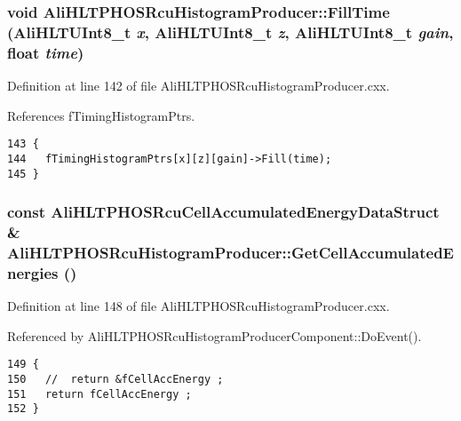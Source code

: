 \subsubsection{\setlength{\rightskip}{0pt plus 5cm}void Ali\-HLTPHOSRcu\-Histogram\-Producer::Fill\-Time ({\bf Ali\-HLTUInt8\_\-t} {\em x}, {\bf Ali\-HLTUInt8\_\-t} {\em z}, {\bf Ali\-HLTUInt8\_\-t} {\em gain}, float {\em time})}\label{classAliHLTPHOSRcuHistogramProducer_a12}




Definition at line 142 of file Ali\-HLTPHOSRcu\-Histogram\-Producer.cxx.

References f\-Timing\-Histogram\-Ptrs.

\footnotesize\begin{verbatim}143 {
144   fTimingHistogramPtrs[x][z][gain]->Fill(time);
145 }
\end{verbatim}\normalsize 


\subsubsection{\setlength{\rightskip}{0pt plus 5cm}const {\bf Ali\-HLTPHOSRcu\-Cell\-Accumulated\-Energy\-Data\-Struct} \& Ali\-HLTPHOSRcu\-Histogram\-Producer::Get\-Cell\-Accumulated\-Energies ()}\label{classAliHLTPHOSRcuHistogramProducer_a4}




Definition at line 148 of file Ali\-HLTPHOSRcu\-Histogram\-Producer.cxx.

Referenced by Ali\-HLTPHOSRcu\-Histogram\-Producer\-Component::Do\-Event().

\footnotesize\begin{verbatim}149 {
150   //  return &fCellAccEnergy ;
151   return fCellAccEnergy ;
152 }
\end{verbatim}\normalsize 



